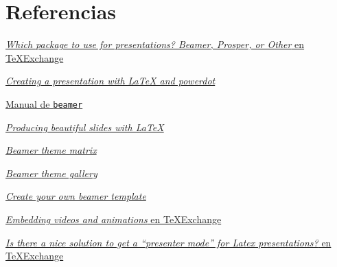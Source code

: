 \section{Referencias}

\href{https://tex.stackexchange.com/questions/16204/which-package-to-use-for-presentations-beamer-prosper-or-other}{\emph{Which
package to use for presentations? Beamer, Prosper, or Other} en
TeXExchange}

\href{http://www.dmi.me.uk/blog/2010/11/08/creating-a-presentation-with-latex-and-powerdot/}{\emph{Creating
a presentation with LaTeX and powerdot}}

\href{http://osl.ugr.es/CTAN/macros/latex/contrib/beamer/doc/beameruserguide.pdf}{Manual
de \lstinline!beamer!}

\href{https://tug.org/pracjourn/2005-2/miller/miller.pdf}{\emph{Producing
beautiful slides with LaTeX}}

\href{https://hartwork.org/beamer-theme-matrix/}{\emph{Beamer theme
matrix}}

\href{http://www.deic.uab.es/~iblanes/beamer_gallery/index.html}{\emph{Beamer
theme gallery}}

\href{https://www.r-bloggers.com/create-your-own-beamer-template/}{\emph{Create
your own beamer template}}

\href{https://tex.stackexchange.com/questions/1574/embedding-videos-and-animations}{\emph{Embedding
videos and animations} en TeXExchange}

\href{https://tex.stackexchange.com/questions/21777/is-there-a-nice-solution-to-get-a-presenter-mode-for-latex-presentations}{\emph{Is
there a nice solution to get a ``presenter mode'' for Latex
presentations?} en TeXExchange}
